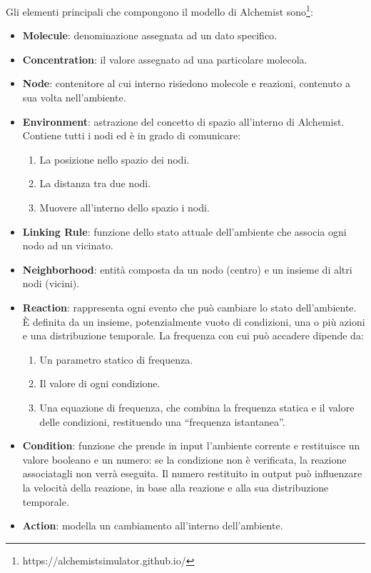 Gli elementi principali che compongono il modello di Alchemist sono\footnote{https://alchemistsimulator.github.io/}:
\begin{itemize}
    \item \textbf{Molecule}: denominazione assegnata ad un dato specifico.
    \item \textbf{Concentration}: il valore assegnato ad una particolare molecola.
    \item \textbf{Node}: contenitore al cui interno risiedono molecole e reazioni, contenuto a sua volta nell'ambiente.
    \item \textbf{Environment}: astrazione del concetto di spazio all'interno di Alchemist. Contiene tutti i nodi ed è in grado di comunicare:
        \begin{enumerate}
            \item La posizione nello spazio dei nodi.
            \item La distanza tra due nodi.
            \item Muovere all'interno dello spazio i nodi.
        \end{enumerate}
    \item \textbf{Linking Rule}: funzione dello stato attuale dell'ambiente che associa ogni nodo ad un vicinato.
    \item \textbf{Neighborhood}: entità composta da un nodo (centro) e un insieme di altri nodi (vicini).
    \item \textbf{Reaction}: rappresenta ogni evento che può cambiare lo stato dell'ambiente. È definita da un insieme, potenzialmente vuoto di condizioni, una o più azioni e una distribuzione temporale.
        La frequenza con cui può accadere dipende da:
        \begin{enumerate}
            \item Un parametro statico di frequenza.
            \item Il valore di ogni condizione.
            \item Una equazione di frequenza, che combina la frequenza statica e il valore delle condizioni, restituendo una ``frequenza istantanea''.
        \end{enumerate}
    \item \textbf{Condition}: funzione che prende in input l'ambiente corrente e restituisce un valore booleano e un numero: se la condizione non è verificata, la reazione associatagli non verrà eseguita.
        Il numero restituito in output può influenzare la velocità della reazione, in base alla reazione e alla sua distribuzione temporale.
    \item \textbf{Action}: modella un cambiamento all'interno dell'ambiente.
\end{itemize}

